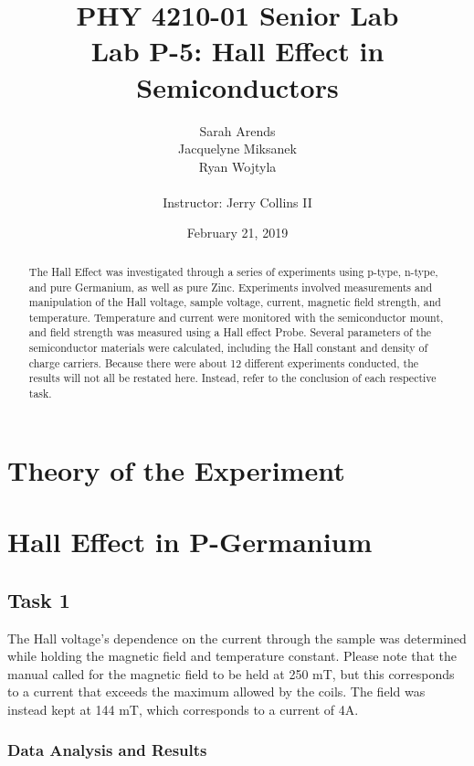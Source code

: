 \documentclass[a4paper]{article}
\title{PHY 4210-01 Senior Lab \\Lab P-5: Hall Effect in Semiconductors}
\author{Sarah Arends \\
        Jacquelyne Miksanek \\
        Ryan Wojtyla \\ \\
        Instructor: Jerry Collins II}
\date{February 21, 2019}
\begin{document}
\maketitle

\begin{abstract}
\qq The Hall Effect was investigated through a series of experiments using p-type, n-type, and pure Germanium, as well as pure Zinc. Experiments involved measurements and manipulation of the Hall voltage, sample voltage, current, magnetic field strength, and temperature. Temperature and current were monitored with the semiconductor mount, and field strength was measured using a Hall effect Probe. Several parameters of the semiconductor materials were calculated, including the Hall constant and density of charge carriers. Because there were about 12 different experiments conducted, the results will not all be restated here. Instead, refer to the conclusion of each respective task.
\end{abstract}

\newpage

\setcounter{tocdepth}{2}
\tableofcontents

\newpage

\section{Theory of the Experiment}

\section{Hall Effect in P-Germanium}

\subsection{Task 1}

\qq The Hall voltage's dependence on the current through the sample
was determined while holding the magnetic field and temperature constant. Please note that the manual called for the magnetic field to be held at 250 mT, 
but this corresponds to a current that exceeds the maximum allowed by 
the coils.
 The field was instead kept at 144 mT, which corresponds to a current of 4A.

\subsubsection{Data Analysis and Results}
\end{document}
